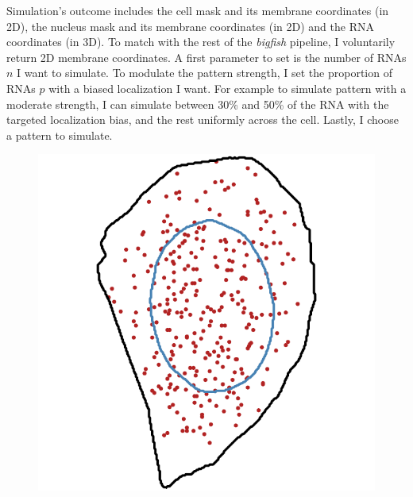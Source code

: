 Simulation's outcome includes the cell mask and its membrane coordinates (in 2D), the nucleus mask and its membrane coordinates (in 2D) and the \ac{RNA} coordinates (in 3D).
To match with the rest of the \emph{bigfish} pipeline, I voluntarily return 2D membrane coordinates.
A first parameter to set is the number of \ac{RNA}s $n$ I want to simulate.
To modulate the pattern strength, I set the proportion of \ac{RNA}s $p$ with a biased localization I want.
For example to simulate pattern with a moderate strength, I can simulate between 30\% and 50\% of the \ac{RNA} with the targeted localization bias, and the rest uniformly across the cell.
Lastly, I choose a pattern to simulate.

\begin{figure}[]
	\centering
		\includegraphics[width=\linewidth]{figures/chapter4/simulation_perinuclear_10}
	\endminipage\hfill

\end{figure}
